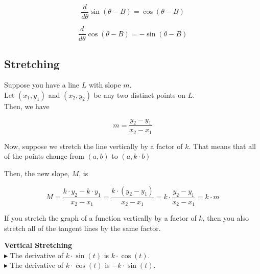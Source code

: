 \documentclass{ximera}
\begin{document}
\begin{notation}

\[
\frac{d}{d\theta} \sin(\theta - B) = \cos(\theta - B)
\]

\[
\frac{d}{d\theta} \cos(\theta - B) = -\sin(\theta - B)
\]

\end{notation}













\subsection{Stretching}


Suppose you have a line $L$ with slope $m$. \\

Let $(x_1, y_1)$ and $(x_2, y_2)$ be any two distinct points on $L$. \\

Then, we have


\[
m = \frac{y_2 - y_1}{x_2 - x_1}
\]






Now, suppose we stretch the line vertically by a factor of $k$.  That means that all of the points change from $(a, b)$ to $(a, k \cdot b)$

Then, the new slope, $M$, is 



\[
M = \frac{k \cdot y_2 - k \cdot y_1}{x_2 - x_1} = \frac{k \cdot (y_2 - y_1)}{x_2 - x_1} = k \cdot \frac{y_2 - y_1}{x_2 - x_1} = k \cdot m
\]


If you stretch the graph of a function vertically by a factor of $k$, then you also stretch all of the tangent lines by the same factor.


\begin{observation} \textbf{\textcolor{purple!85!blue}{Vertical Stretching}}   \\

$\blacktriangleright$ The derivative of $k \cdot \sin(t)$ is $k \cdot \cos(t)$. \\

$\blacktriangleright$ The derivative of $k \cdot \cos(t)$ is $-k \cdot \sin(t)$. \\

\end{observation}
\end{document}
